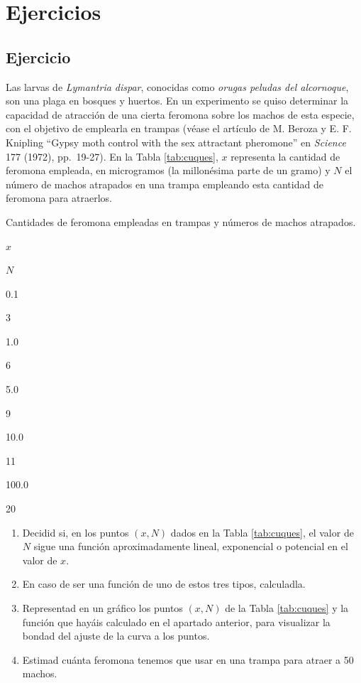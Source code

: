 \documentclass[]{book}
\theoremstyle{definition}
\theoremstyle{definition}
\theoremstyle{definition}
\theoremstyle{remark}
\begin{document}
\hypertarget{ejercicios-1}{%
\section{Ejercicios}\label{ejercicios-1}}

\hypertarget{ejercicio-1}{%
\subsection*{Ejercicio}\label{ejercicio-1}}

Las larvas de \emph{Lymantria dispar}, conocidas como \emph{orugas peludas del alcornoque}, son una plaga en bosques y huertos. En un experimento se quiso determinar la capacidad de atracción de una cierta feromona sobre los machos de esta especie, con el objetivo de emplearla en trampas (véase el artículo de M. Beroza y E. F. Knipling ``Gypsy moth control with the sex attractant pheromone'' en \emph{Science} 177 (1972), pp.~19-27).
En la Tabla \ref{tab:cuques}, \(x\) representa la cantidad de feromona empleada, en microgramos (la millonésima parte de un gramo) y \(N\) el número de machos atrapados en una trampa empleando esta cantidad de feromona para atraerlos.

\label{tab:cuques}Cantidades de feromona empleadas en trampas y números de machos atrapados.

\(x\)

\(N\)

0.1

3

1.0

6

5.0

9

10.0

11

100.0

20

\begin{enumerate}
\def\labelenumi{\arabic{enumi}.}
\item
  Decidid si, en los puntos \((x,N)\) dados en la Tabla \ref{tab:cuques}, el valor de \(N\) sigue una función aproximadamente lineal, exponencial o potencial en el valor de \(x\).
\item
  En caso de ser una función de uno de estos tres tipos, calculadla.
\item
  Representad en un gráfico los puntos \((x,N)\) de la Tabla \ref{tab:cuques} y la función que hayáis calculado en el apartado anterior, para visualizar la bondad del ajuste de la curva a los puntos.
\item
  Estimad cuánta feromona tenemos que usar en una trampa para atraer a 50 machos.
\end{enumerate}
\end{document}
